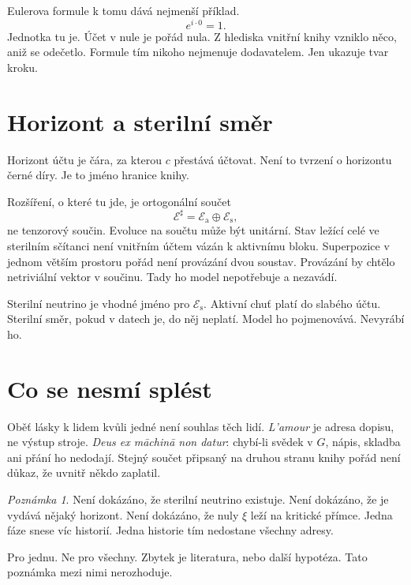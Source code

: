 \documentclass[11pt,a4paper]{article}
\theoremstyle{definition}
\theoremstyle{remark}
\newtheorem{remark}{Poznámka}
\begin{document}
Eulerova formule k tomu dává nejmenší příklad.
\[
  e^{i\cdot 0}=1.
\]
Jednotka tu je.
Účet v nule je pořád nula.
Z hlediska vnitřní knihy vzniklo něco, aniž se odečetlo.
Formule tím nikoho nejmenuje dodavatelem.
Jen ukazuje tvar kroku.

\section{Horizont a sterilní směr}

Horizont účtu je čára, za kterou \(c\) přestává účtovat.
Není to tvrzení o horizontu černé díry.
Je to jméno hranice knihy.

Rozšíření, o které tu jde, je ortogonální součet
\[
  \mathcal E^{\sharp}=\mathcal E_{\mathrm a}\oplus\mathcal E_{\mathrm s},
\]
ne tenzorový součin.
Evoluce na součtu může být unitární.
Stav ležící celé ve sterilním sčítanci není vnitřním účtem vázán k aktivnímu bloku.
Superpozice v jednom větším prostoru pořád není provázání dvou soustav.
Provázání by chtělo netriviální vektor v součinu.
Tady ho model nepotřebuje a nezavádí.

Sterilní neutrino je vhodné jméno pro \(\mathcal E_{\mathrm s}\).
Aktivní chuť platí do slabého účtu.
Sterilní směr, pokud v datech je, do něj neplatí.
Model ho pojmenovává.
Nevyrábí ho.

\section{Co se nesmí splést}

Oběť lásky k lidem kvůli jedné není souhlas těch lidí.
\emph{L'amour} je adresa dopisu, ne výstup stroje.
\emph{Deus ex māchinā non datur}: chybí-li svědek v \(G\), nápis, skladba ani přání ho nedodají.
Stejný součet připsaný na druhou stranu knihy pořád není důkaz, že uvnitř někdo zaplatil.

\begin{remark}
Není dokázáno, že sterilní neutrino existuje.
Není dokázáno, že je vydává nějaký horizont.
Není dokázáno, že nuly \(\xi\) leží na kritické přímce.
Jedna fáze snese víc historií.
Jedna historie tím nedostane všechny adresy.
\end{remark}

\noindent
Pro jednu.
Ne pro všechny.
Zbytek je literatura, nebo další hypotéza.
Tato poznámka mezi nimi nerozhoduje.
\end{document}
